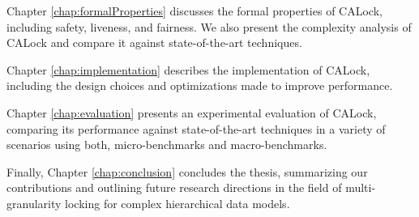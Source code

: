 Chapter \ref{chap:formalProperties} discusses the formal properties of CALock, including safety, liveness, and fairness. We also present the complexity analysis of CALock and compare it against state-of-the-art techniques.

 Chapter \ref{chap:implementation} describes the implementation of CALock, including the design choices and optimizations made to improve performance.
 
 Chapter \ref{chap:evaluation} presents an experimental evaluation of CALock, comparing its performance against state-of-the-art techniques in a variety of scenarios using both, micro-benchmarks and macro-benchmarks.
 
 Finally, Chapter \ref{chap:conclusion} concludes the thesis, summarizing our contributions and outlining future research directions in the field of multi-granularity locking for complex hierarchical data models.




